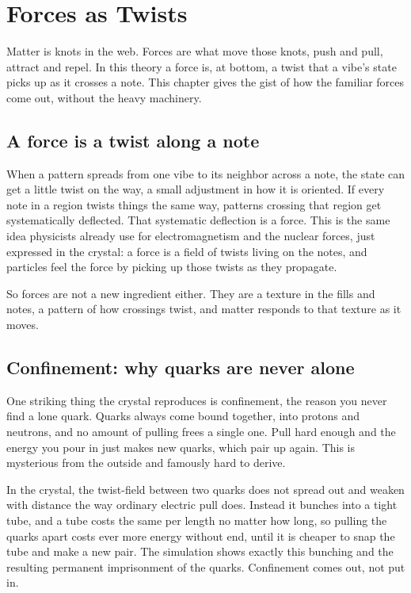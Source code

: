 \section{Forces as Twists}

Matter is knots in the web. Forces are what move those knots, push and pull, attract and repel. In this theory a force is, at bottom, a twist that a vibe's state picks up as it crosses a note. This chapter gives the gist of how the familiar forces come out, without the heavy machinery.

\subsection{A force is a twist along a note}

When a pattern spreads from one vibe to its neighbor across a note, the state can get a little twist on the way, a small adjustment in how it is oriented. If every note in a region twists things the same way, patterns crossing that region get systematically deflected. That systematic deflection is a force. This is the same idea physicists already use for electromagnetism and the nuclear forces, just expressed in the crystal: a force is a field of twists living on the notes, and particles feel the force by picking up those twists as they propagate.

So forces are not a new ingredient either. They are a texture in the fills and notes, a pattern of how crossings twist, and matter responds to that texture as it moves.

\subsection{Confinement: why quarks are never alone}

One striking thing the crystal reproduces is confinement, the reason you never find a lone quark. Quarks always come bound together, into protons and neutrons, and no amount of pulling frees a single one. Pull hard enough and the energy you pour in just makes new quarks, which pair up again. This is mysterious from the outside and famously hard to derive.

In the crystal, the twist-field between two quarks does not spread out and weaken with distance the way ordinary electric pull does. Instead it bunches into a tight tube, and a tube costs the same per length no matter how long, so pulling the quarks apart costs ever more energy without end, until it is cheaper to snap the tube and make a new pair. The simulation shows exactly this bunching and the resulting permanent imprisonment of the quarks. Confinement comes out, not put in.

